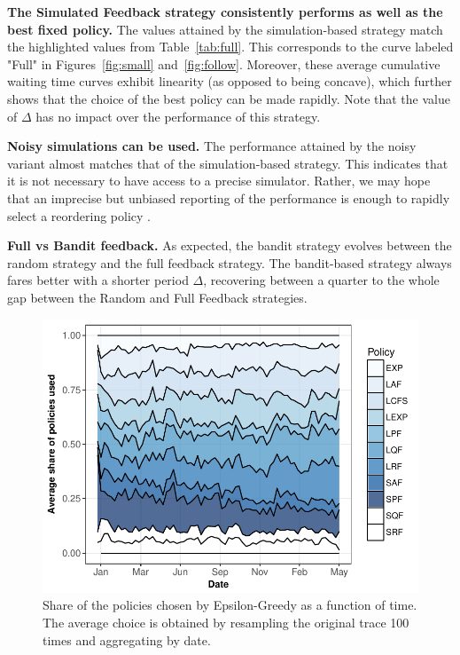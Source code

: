 \documentclass[sigconf,anonymous]{acmart}
\begin{document}
\textbf{The Simulated Feedback strategy consistently performs as well as the
best fixed policy.} The values attained by the simulation-based strategy match
the highlighted values from Table~\ref{tab:full}. This corresponds to the curve
labeled "Full" in Figures~\ref{fig:small} and~\ref{fig:follow}. Moreover,
these average cumulative waiting time curves exhibit linearity (as opposed to
being concave), which further shows that the choice of the best policy can be
made rapidly.  Note that the value of $\Delta$ has no impact over the
performance of this strategy.

\textbf{Noisy simulations can be used.} The performance attained by the noisy
variant almost matches that of the simulation-based strategy. This indicates
that it is not necessary to have access to a precise simulator. Rather, we may
hope that an imprecise but unbiased reporting of the performance is enough to
rapidly select a reordering policy .

\textbf{Full vs Bandit feedback.} As expected, the bandit strategy evolves
between the random strategy and the full feedback strategy. The bandit-based
strategy always fares better with a shorter period $\Delta$, recovering between
a quarter to the whole gap between the Random and Full Feedback strategies.

\begin{figure}[]
  \centering
  \includegraphics[scale=0.6]{figures/mosaicbandit-ANL-Intr.pdf}

  \caption{Share of the policies chosen by Epsilon-Greedy as a function of
  time. The average choice is obtained by resampling the original trace 100
times and aggregating by date.}

  \label{fig:mosb}
\end{figure}
\end{document}
